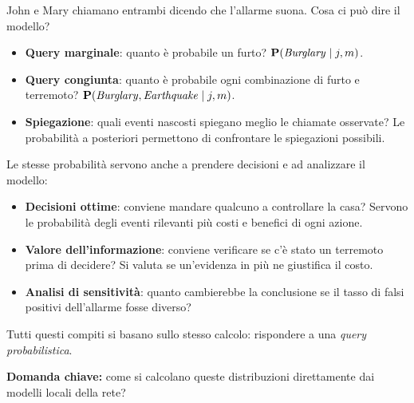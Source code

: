 John e Mary chiamano entrambi dicendo che l'allarme suona. Cosa ci può dire il
modello?
\begin{itemize}
  \item \textbf{Query marginale}: quanto è probabile un furto?
        $\mathbf{P}(\mathit{Burglary}\mid j, m)$.
  \item \textbf{Query congiunta}: quanto è probabile ogni combinazione di furto e
        terremoto? $\mathbf{P}(\mathit{Burglary},\mathit{Earthquake}\mid j, m)$.
  \item \textbf{Spiegazione}: quali eventi nascosti spiegano meglio le chiamate
        osservate? Le probabilità a posteriori permettono di confrontare le
        spiegazioni possibili.
\end{itemize}

Le stesse probabilità servono anche a prendere decisioni e ad analizzare il
modello:
\begin{itemize}
  \item \textbf{Decisioni ottime}: conviene mandare qualcuno a controllare la
        casa? Servono le probabilità degli eventi rilevanti più costi e
        benefici di ogni azione.
  \item \textbf{Valore dell'informazione}: conviene verificare se c'è stato un
        terremoto prima di decidere? Si valuta se un'evidenza in più ne
        giustifica il costo.
  \item \textbf{Analisi di sensitività}: quanto cambierebbe la conclusione se il
        tasso di falsi positivi dell'allarme fosse diverso?
\end{itemize}
Tutti questi compiti si basano sullo stesso calcolo: rispondere a una
\emph{query probabilistica}.


\textbf{Domanda chiave:} come si calcolano queste distribuzioni direttamente dai
modelli locali della rete?

